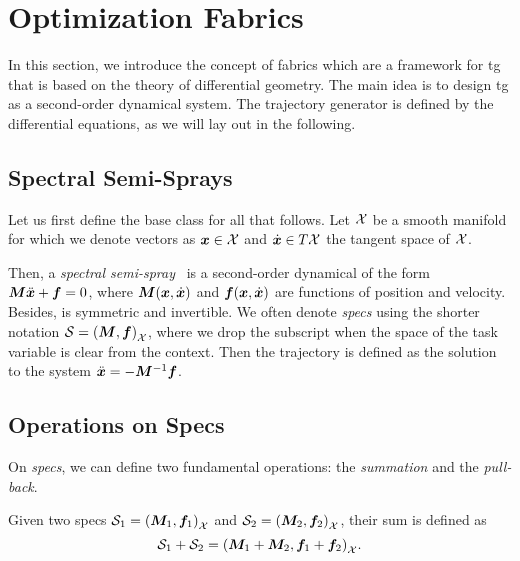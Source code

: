 

\section{Optimization Fabrics} %
\label{sec:optimization_fabrics}

In this section, we introduce the concept of \acf{fabrics}
which are a framework for \ac{tg}
that is based on the theory of differential
geometry. The main idea is to design \ac{tg} as a
second-order dynamical system. The trajectory generator is
defined by the differential equations, as we will lay out in
the following.

\subsection{Spectral Semi-Sprays} %
\label{sub:spectral_semi_sprays}

Let us first define the base class for all that follows.
Let $\mathcal{X}$ be a smooth manifold for which we denote vectors as 
$\bm{x}\in\mathcal{X}$ and $\dot{\bm{x}}\in T\mathcal{X}$ the tangent space of $\mathcal{X}$.

Then, a \textit{spectral semi-spray}~\cite{Ratliff2020} is a
second-order dynamical of the form $\bm{M}\ddot{\bm{x}} + \bm{f} = 0$,
where $\bm{M}(\bm{x},\dot{\bm{x}})$ and $\bm{f}(\bm{x},\dot{\bm{x}})$ are functions of
position and velocity. Besides, \M{} is symmetric and
invertible. We often denote \textit{specs} using the shorter
notation $\mathcal{S} = \left(\bm{M},\bm{f}\right)_{\mathcal{X}}$, where we drop the subscript when
the space of the task variable is clear from the context.
Then the trajectory is defined as the solution to the system
$\ddot{\bm{x}}=-\bm{M}^{-1}\bm{f}$.


\subsection{Operations on Specs} %
\label{sub:operations_on_specs}

On \textit{specs}, we can define two fundamental operations:
the \textit{summation} and the \textit{pull-back}.

Given two specs $\mathcal{S}_1 = {\left(\bm{M}_1,\bm{f}_1\right)}_{\mathcal{X}}$ and
$\mathcal{S}_2 = {\left(\bm{M}_2,\bm{f}_2\right)}_{\mathcal{X}}$, their sum is
defined as
\begin{equation}
  \mathcal{S}_1 + \mathcal{S}_2 = {\left(\bm{M}_1 + \bm{M}_2, \bm{f}_1 + \bm{f}_2\right)}_{\mathcal{X}}.
  \label{eq:summation}
\end{equation}

